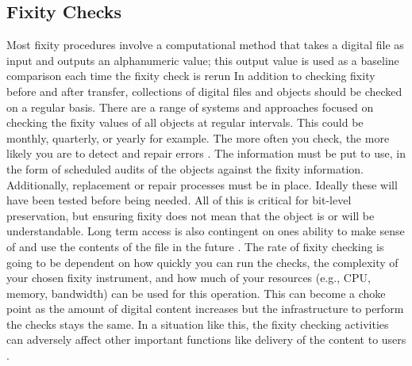 \subsection{Fixity Checks}
Most fixity procedures involve a computational method that takes a digital file as input and outputs an alphanumeric value; this output value is used as a baseline comparison each time the fixity check is rerun \cite[5]{ndsa2017fixity}
In addition to checking fixity before and after transfer, collections of digital files and objects should be checked on a regular basis. There are a range of systems and approaches focused on checking the fixity values of all objects at regular intervals. This could be monthly, quarterly, or yearly for example. The more often you check, the more likely you are to detect and repair errors \cite[3]{ndsa2014fixity}.
The information must be put to use, in the form of scheduled audits of the objects against the fixity information. Additionally, replacement or repair processes must be in place. Ideally these will have been tested before being needed. All of this is critical for bit-level preservation, but ensuring fixity does not mean that the object is or will be understandable. Long term access is also contingent on ones ability to make sense of and use the contents of the file in the future \cite[1]{ndsa2014fixity}.
The rate of fixity checking is going to be dependent on how quickly you can run the checks, the complexity of your chosen fixity instrument, and how much of your resources (e.g., CPU, memory, bandwidth) can be used for this operation. This can become a choke point as the amount of digital content increases but the infrastructure to perform the checks stays the same. In a situation like this, the fixity checking activities can adversely affect other important functions like delivery of the content to users \cite[4]{ndsa2014fixity}.
